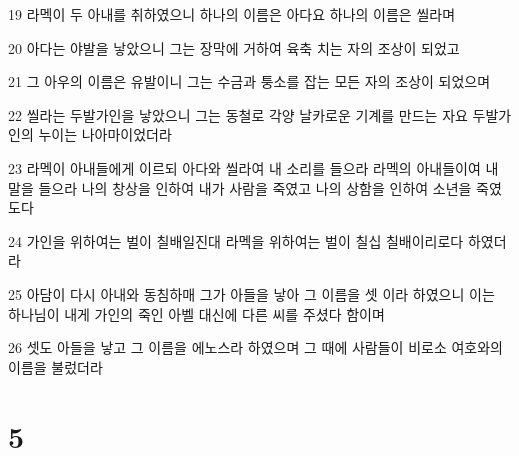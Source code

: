 \par 19 라멕이 두 아내를 취하였으니 하나의 이름은 아다요 하나의 이름은 씰라며
\par 20 아다는 야발을 낳았으니 그는 장막에 거하여 육축 치는 자의 조상이 되었고
\par 21 그 아우의 이름은 유발이니 그는 수금과 퉁소를 잡는 모든 자의 조상이 되었으며
\par 22 씰라는 두발가인을 낳았으니 그는 동철로 각양 날카로운 기계를 만드는 자요 두발가인의 누이는 나아마이었더라
\par 23 라멕이 아내들에게 이르되 아다와 씰라여 내 소리를 들으라 라멕의 아내들이여 내 말을 들으라 나의 창상을 인하여 내가 사람을 죽였고 나의 상함을 인하여 소년을 죽였도다
\par 24 가인을 위하여는 벌이 칠배일진대 라멕을 위하여는 벌이 칠십 칠배이리로다 하였더라
\par 25 아담이 다시 아내와 동침하매 그가 아들을 낳아 그 이름을 셋 이라 하였으니 이는 하나님이 내게 가인의 죽인 아벨 대신에 다른 씨를 주셨다 함이며
\par 26 셋도 아들을 낳고 그 이름을 에노스라 하였으며 그 때에 사람들이 비로소 여호와의 이름을 불렀더라

\chapter{5}

